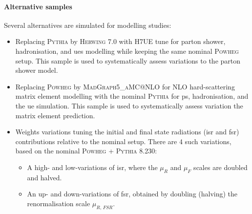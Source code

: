 \paragraph{Alternative samples} Several alternatives are simulated for modelling studies:
\begin{itemize}
  \item Replacing \textsc{Pythia} by \textsc{Herwing} 7.0 with H7UE tune \cite{herwig7R} for parton shower, hadronisation, and \gls{ue}s modelling while keeping the same nominal \textsc{Powheg} setup. This sample is used to systematically assess variations to the parton shower model.
  \item Replacing \textsc{Powheg} by \textsc{MadGraph5\_aMC@NLO} \cite{madgraph} for NLO hard-scattering matrix element modelling with the nominal \textsc{Pythia} for \gls{ps}, hadronisation, and the \gls{ue} simulation. This sample is used to systematically assess variation the matrix element prediction.
  \item Weights variations tuning the initial and final state radiations (\gls{isr} and \gls{fsr}) contributions relative to the nominal setup. There are 4 such variations, based on the nominal \textsc{Powheg} + \textsc{Pythia} 8.230:
  \begin{itemize}
    \item A high- and low-variations of \gls{isr}, where the $\mu_R$ and $\mu_F$ scales are doubled and halved. %
    \item An up- and down-variations of \gls{fsr}, obtained by doubling (halving) the renormalisation scale $\mu_{R,\, FSR}$. %
  \end{itemize}
\end{itemize} 

